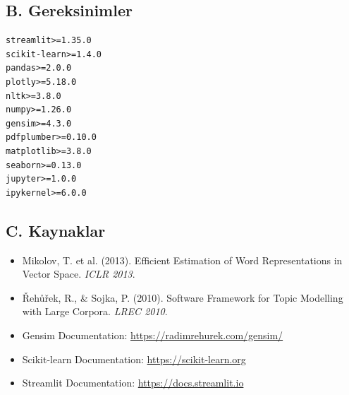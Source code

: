 \documentclass[12pt, a4paper]{article}
\begin{document}
\subsection*{B. Gereksinimler}

\begin{lstlisting}[style=kod, language={}, caption={requirements.txt}]
streamlit>=1.35.0
scikit-learn>=1.4.0
pandas>=2.0.0
plotly>=5.18.0
nltk>=3.8.0
numpy>=1.26.0
gensim>=4.3.0
pdfplumber>=0.10.0
matplotlib>=3.8.0
seaborn>=0.13.0
jupyter>=1.0.0
ipykernel>=6.0.0
\end{lstlisting}

\subsection*{C. Kaynaklar}

\begin{itemize}
    \item Mikolov, T. et al. (2013). Efficient Estimation of Word Representations in Vector Space. \textit{ICLR 2013}.
    \item Řehůřek, R., \& Sojka, P. (2010). Software Framework for Topic Modelling with Large Corpora. \textit{LREC 2010}.
    \item Gensim Documentation: \url{https://radimrehurek.com/gensim/}
    \item Scikit-learn Documentation: \url{https://scikit-learn.org}
    \item Streamlit Documentation: \url{https://docs.streamlit.io}
\end{itemize}
\end{document}
